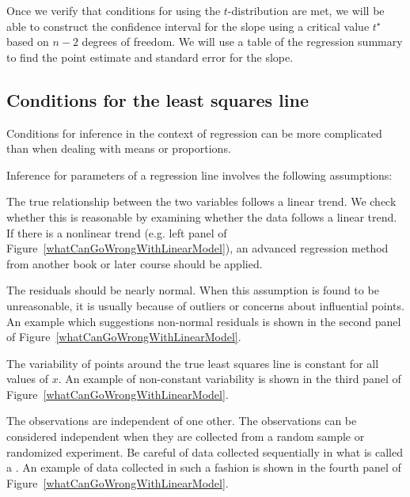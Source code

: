 Once we verify that conditions for using the $t$-distribution are met, we will be able to construct the confidence interval for the slope using a critical value $t^{\star}$ based on $n-2$ degrees of freedom.  We will use a table of the regression summary to find the point estimate and standard error for the slope.


\subsection{Conditions for the least squares line}

Conditions for inference in the context of regression can be more complicated than when dealing with means or proportions.  

Inference for parameters of a regression line involves the following assumptions:
\begin{description}
\setlength{\itemsep}{0mm}
\item[Linearity.] The true relationship between the two variables follows a linear trend.  We check whether this is reasonable by examining whether the data follows a linear trend.  If there is a nonlinear trend (e.g. left panel of Figure~\ref{whatCanGoWrongWithLinearModel}), an advanced regression method from another book or later course should be applied.
\item[Nearly normal residuals.] The residuals should be nearly normal.
When this assumption is found to be unreasonable, it is usually because of outliers or concerns about influential points.  An example which suggestions non-normal residuals is shown in the second panel of Figure~\ref{whatCanGoWrongWithLinearModel}.
\item[Constant variability.] The variability of points around the true least squares line is constant for all values of $x$. An example of non-constant variability is shown in the third panel of Figure~\ref{whatCanGoWrongWithLinearModel}.
\item[Independent.] The observations are independent of one other.  The observations can be considered independent when they are collected from a random sample or randomized experiment.  Be careful of data collected sequentially in what is called a .  An example of data collected in such a fashion is shown in the fourth panel of Figure~\ref{whatCanGoWrongWithLinearModel}.
\end{description}

